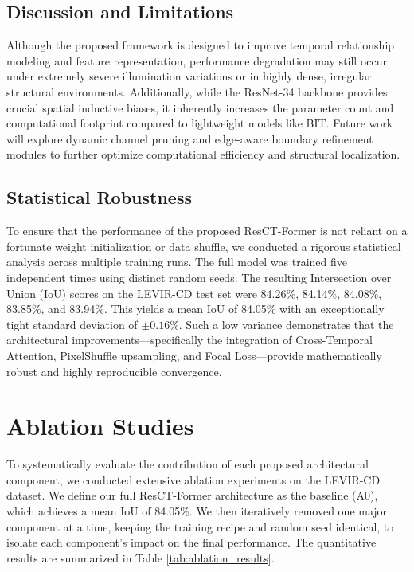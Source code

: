\documentclass[conference]{IEEEtran}
\begin{document}
\subsection{Discussion and Limitations}

Although the proposed framework is designed to improve temporal relationship modeling and feature representation, performance degradation may still occur under extremely severe illumination variations or in highly dense, irregular structural environments. Additionally, while the ResNet-34 backbone provides crucial spatial inductive biases, it inherently increases the parameter count and computational footprint compared to lightweight models like BIT. Future work will explore dynamic channel pruning and edge-aware boundary refinement modules to further optimize computational efficiency and structural localization.

\subsection{Statistical Robustness}
To ensure that the performance of the proposed ResCT-Former is not reliant on a fortunate weight initialization or data shuffle, we conducted a rigorous statistical analysis across multiple training runs. The full model was trained five independent times using distinct random seeds. The resulting Intersection over Union (IoU) scores on the LEVIR-CD test set were 84.26\%, 84.14\%, 84.08\%, 83.85\%, and 83.94\%. This yields a mean IoU of 84.05\% with an exceptionally tight standard deviation of $\pm 0.16\%$. Such a low variance demonstrates that the architectural improvements—specifically the integration of Cross-Temporal Attention, PixelShuffle upsampling, and Focal Loss—provide mathematically robust and highly reproducible convergence.

\section{Ablation Studies}
\label{sec:ablation}

To systematically evaluate the contribution of each proposed architectural component, we conducted extensive ablation experiments on the LEVIR-CD dataset. We define our full ResCT-Former architecture as the baseline (A0), which achieves a mean IoU of 84.05\%. We then iteratively removed one major component at a time, keeping the training recipe and random seed identical, to isolate each component's impact on the final performance. The quantitative results are summarized in Table \ref{tab:ablation_results}.
\end{document}

